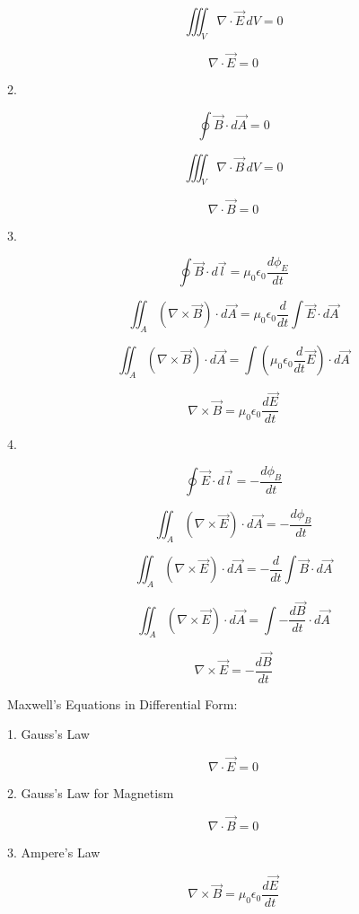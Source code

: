 \[
\iiint_V \nabla \cdot \vec{E} \, dV = 0
\]

\[
\nabla \cdot \vec{E} = 0
\]

\vspace{1em}

2.

\[
\oint \vec{B} \cdot d\vec{A} = 0
\]

\[
\iiint_V \nabla \cdot \vec{B} \, dV = 0
\]

\[
\nabla \cdot \vec{B} = 0
\]

\vspace{1em}

3.

\[
\oint \vec{B} \cdot d\vec{l} = \mu_0 \epsilon_0 \frac{d \phi_E}{dt}
\]

\[
\iint_A (\nabla \times \vec{B}) \cdot d\vec{A} = \mu_0 \epsilon_0 \frac{d}{dt} \int \vec{E} \cdot d\vec{A}
\]

\[
\iint_A (\nabla \times \vec{B}) \cdot d\vec{A} = \int (\mu_0 \epsilon_0 \frac{d}{dt} \vec{E}) \cdot d\vec{A}
\]

\[
\nabla \times \vec{B} = \mu_0 \epsilon_0 \frac{d \vec{E}}{dt}
\]

\vspace{1em}

4. 

\[
\oint \vec{E} \cdot d\vec{l} = -\frac{d \phi_B}{dt}
\]

\[
\iint_A (\nabla \times \vec{E}) \cdot d\vec{A} = -\frac{d \phi_B}{dt}
\]

\[
\iint_A (\nabla \times \vec{E}) \cdot d\vec{A} = -\frac{d}{dt} \int \vec{B} \cdot d\vec{A}
\]

\[
\iint_A (\nabla \times \vec{E}) \cdot d\vec{A} = \int -\frac{d \vec{B}}{dt} \cdot d\vec{A}
\]

\[
\nabla \times \vec{E} = -\frac{d \vec{B}}{dt}
\]

\vspace{1em}

Maxwell's Equations in Differential Form:

\vspace{1em}

1. Gauss's Law

\[
\nabla \cdot \vec{E} = 0
\]

2. Gauss's Law for Magnetism

\[
\nabla \cdot \vec{B} = 0
\]

3. Ampere's Law

\[
\nabla \times \vec{B} = \mu_0 \epsilon_0 \frac{d \vec{E}}{dt}
\]

